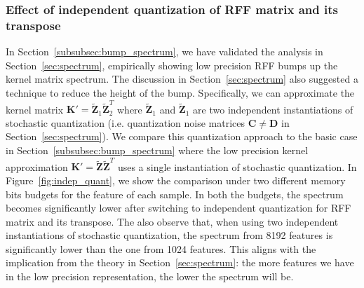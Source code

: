 \subsubsection{Effect of independent quantization of RFF matrix and its transpose}
In Section~\ref{subsubsec:bump_spectrum}, we have validated the analysis in Section~\ref{sec:spectrum}, empirically showing low precision RFF bumps up the kernel matrix spectrum. The discussion in Section~\ref{sec:spectrum} also suggested a technique to reduce the height of the bump. Specifically, we can approximate the kernel matrix $\bm{K}'=\tilde{\bm{Z}}_1\tilde{\bm{Z}}_2^T$ where $\tilde{\bm{Z}}_1$ and $\tilde{\bm{Z}}_1$ are two independent instantiations of stochastic quantization (i.e. quantization noise matrices $\bm{C}\neq \bm{D}$ in Section~\ref{sec:spectrum}).
We compare this quantization approach to the basic case in Section~\ref{subsubsec:bump_spectrum} where the low precision kernel approximation $\bm{K}'=\tilde{\bm{Z}}\tilde{\bm{Z}}^T$ uses a single instantiation of stochastic quantization. In Figure~\ref{fig:indep_quant}, we show the comparison under two different memory bits budgets for the feature of each sample. In both the budgets, the spectrum becomes significantly lower after switching to independent quantization for RFF matrix and its transpose. The also observe that, when using two independent instantiations of stochastic quantization, the spectrum from 8192 features is significantly lower than the one from 1024 features. This aligns with the implication from the theory in Section~\ref{sec:spectrum}: the more features we have in the low precision representation, the lower the spectrum will be.


